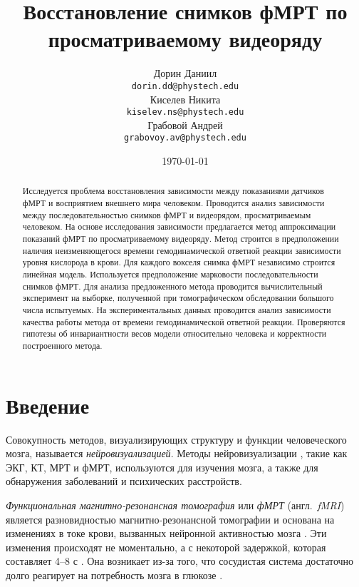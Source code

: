 \documentclass[a4paper, 12pt]{extarticle}
\title{Восстановление снимков фМРТ по просматриваемому видеоряду}
\author{
	Дорин Даниил \\
	\texttt{dorin.dd@phystech.edu} \\
	\And
	Киселев Никита \\
	\texttt{kiselev.ns@phystech.edu} \\
	\And
	Грабовой Андрей \\
	\texttt{grabovoy.av@phystech.edu}
}
\date{\today}
\begin{document}
\maketitle

\begin{abstract}

	Исследуется проблема восстановления зависимости между показаниями датчиков фМРТ
	и восприятием внешнего мира человеком.
	Проводится анализ зависимости между последовательностью снимков фМРТ и видеорядом,
	просматриваемым человеком.
	На основе исследования зависимости предлагается метод аппроксимации показаний фМРТ по
	просматриваемому видеоряду. Метод строится в предположении наличия неизменяющегося
	времени гемодинамической ответной реакции зависимости уровня кислорода в крови. 
	Для каждого вокселя снимка фМРТ независимо строится линейная модель. 
	Используется предположение марковости последовательности снимков фМРТ.
	Для анализа предложенного метода проводится вычислительный эксперимент на
	выборке, полученной при томографическом обследовании большого числа испытуемых.
	На экспериментальных данных проводится анализ зависимости 
	качества работы метода от времени гемодинамической ответной реакции.
	Проверяются гипотезы об инвариантности весов модели относительно человека
	и корректности построенного метода.

\end{abstract}



\section{Введение}

Совокупность методов, визуализирующих структуру и функции человеческого мозга,
называется \textit{нейровизуализацией}. Методы нейровизуализации \citep{puras2014neurovisualization}, такие как ЭКГ, КТ, МРТ и фМРТ,
используются для изучения мозга, а также для обнаружения заболеваний и психических расстройств.

\textit{Функциональная магнитно-резонансная томография} или \textit{фМРТ} (англ.~\textit{fMRI})
является разновидностью магнитно-резонансной томографии и основана на изменениях в токе крови,
вызванных нейронной активностью мозга \citep{Glover2011}.
Эти изменения происходят не моментально, а с некоторой задержкой,
которая составляет 4--8 с \citep{Bandettini1992}.
Она возникает из-за того, что сосудистая система достаточно долго реагирует
на потребность мозга в глюкозе \citep{Ogawa1990, LEBIHAN1995231, Logothetis2003}. 
\end{document}
